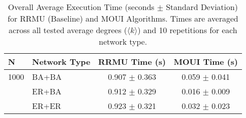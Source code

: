 \begin{table}[htbp]
\centering
\caption{Overall Average Execution Time (seconds $\pm$ Standard Deviation) for RRMU (Baseline) and MOUI Algorithms. Times are averaged across all tested average degrees ($\langle k \rangle$) and 10 repetitions for each network type.}
\label{tab:execution_time_overall}
\begin{tabular}{l l c c}
\toprule
N & Network Type & RRMU Time (s) & MOUI Time (s) \\
\midrule
1000 & BA+BA & 0.907 $\pm$ 0.363 & 0.059 $\pm$ 0.041 \\
 & ER+BA & 0.912 $\pm$ 0.329 & 0.016 $\pm$ 0.009 \\
 & ER+ER & 0.923 $\pm$ 0.321 & 0.032 $\pm$ 0.023 \\
\bottomrule
\end{tabular}%
\end{table}
